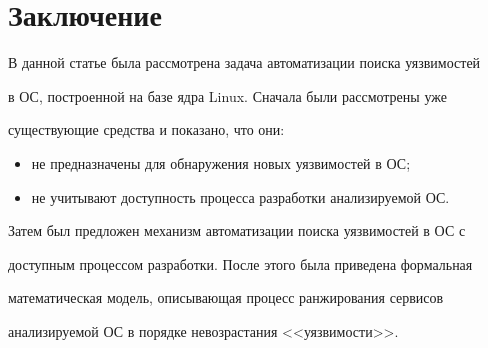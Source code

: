   


\section{Заключение}


  


  В данной статье была рассмотрена задача автоматизации поиска уязвимостей 


в ОС, построенной на базе ядра Linux. Сначала были рассмотрены уже 


существующие средства и показано, что они:


  \begin{itemize}


\item не предназначены для обнаружения новых уязвимостей в ОС;


\item не учитывают доступность процесса разработки анализируемой ОС.


\end{itemize}





  Затем был предложен механизм автоматизации поиска уязвимостей в ОС с 


доступным процессом разработки. После этого была приведена формальная 


математическая модель, описывающая процесс ранжирования сервисов 


анализируемой ОС в порядке невозрастания <<уязвимости>>.





